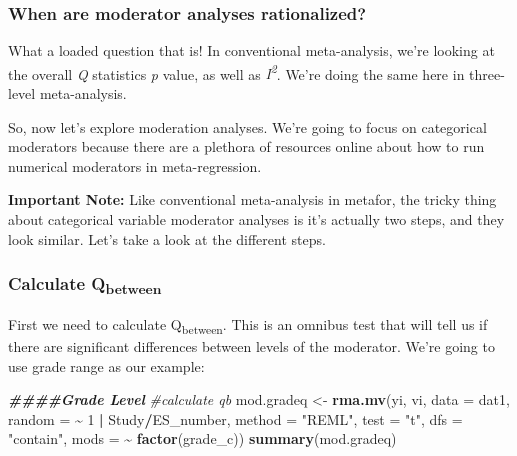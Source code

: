 \documentclass[
]{book}
\newenvironment{Shaded}{\begin{snugshade}}{\end{snugshade}}
\newcommand{\AttributeTok}[1]{\textcolor[rgb]{0.13,0.29,0.53}{#1}}
\newcommand{\CommentTok}[1]{\textcolor[rgb]{0.56,0.35,0.01}{\textit{#1}}}
\newcommand{\DecValTok}[1]{\textcolor[rgb]{0.00,0.00,0.81}{#1}}
\newcommand{\DocumentationTok}[1]{\textcolor[rgb]{0.56,0.35,0.01}{\textbf{\textit{#1}}}}
\newcommand{\FunctionTok}[1]{\textcolor[rgb]{0.13,0.29,0.53}{\textbf{#1}}}
\newcommand{\NormalTok}[1]{#1}
\newcommand{\OtherTok}[1]{\textcolor[rgb]{0.56,0.35,0.01}{#1}}
\newcommand{\SpecialCharTok}[1]{\textcolor[rgb]{0.81,0.36,0.00}{\textbf{#1}}}
\newcommand{\StringTok}[1]{\textcolor[rgb]{0.31,0.60,0.02}{#1}}
\begin{document}
\hypertarget{when-are-moderator-analyses-rationalized}{%
\subsubsection{When are moderator analyses rationalized?}\label{when-are-moderator-analyses-rationalized}}

What a loaded question that is! In conventional meta-analysis, we're looking at the overall \emph{Q} statistics \emph{p} value, as well as \emph{I\textsuperscript{2}}. We're doing the same here in three-level meta-analysis.

So, now let's explore moderation analyses. We're going to focus on categorical moderators because there are a plethora of resources online about how to run numerical moderators in meta-regression.

\textbf{Important Note:} Like conventional meta-analysis in metafor, the tricky thing about categorical variable moderator analyses is it's actually two steps, and they look similar. Let's take a look at the different steps.

\hypertarget{calculate-qbetween-1}{%
\subsubsection{\texorpdfstring{Calculate Q\textsubscript{between}}{Calculate Qbetween}}\label{calculate-qbetween-1}}

First we need to calculate Q\textsubscript{between}. This is an omnibus test that will tell us if there are significant differences between levels of the moderator. We're going to use grade range as our example:

\begin{Shaded}
\begin{Highlighting}[]
\DocumentationTok{\#\#\#\#Grade Level  }
\CommentTok{\#calculate qb}
\NormalTok{mod.gradeq }\OtherTok{\textless{}{-}} \FunctionTok{rma.mv}\NormalTok{(yi,}
\NormalTok{                     vi,}
                     \AttributeTok{data =}\NormalTok{ dat1,}
                     \AttributeTok{random =} \SpecialCharTok{\textasciitilde{}} \DecValTok{1} \SpecialCharTok{|}\NormalTok{ Study}\SpecialCharTok{/}\NormalTok{ES\_number, }
                     \AttributeTok{method =} \StringTok{"REML"}\NormalTok{,}
                     \AttributeTok{test =} \StringTok{"t"}\NormalTok{,}
                     \AttributeTok{dfs =} \StringTok{"contain"}\NormalTok{,}
                     \AttributeTok{mods =} \SpecialCharTok{\textasciitilde{}} \FunctionTok{factor}\NormalTok{(grade\_c))}
\FunctionTok{summary}\NormalTok{(mod.gradeq)}
\end{Highlighting}
\end{Shaded}
\end{document}
